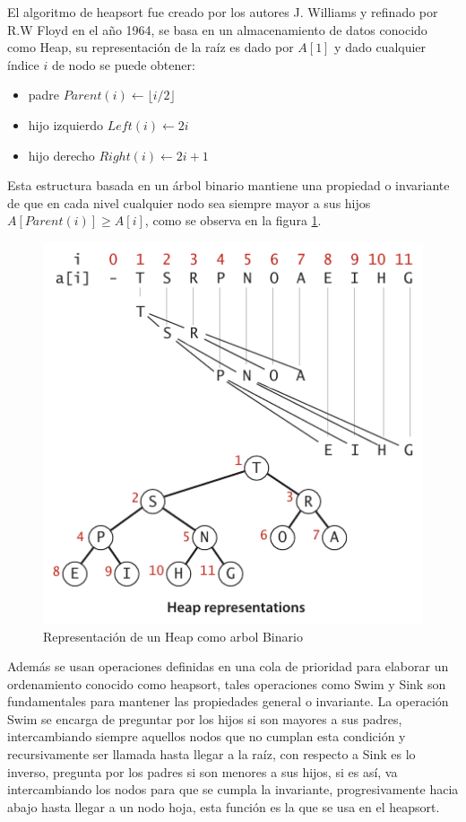 \documentclass{article}
\begin{document}
    		        El algoritmo de heapsort fue creado por los autores J. Williams y refinado por R.W Floyd en el año 1964, se basa en un almacenamiento de datos conocido como Heap, su representación de la ra\'{i}z es dado por $A[1]$ y dado cualquier \'{i}ndice $i$ de nodo se puede obtener:
    		        \begin{itemize}
    		            \item padre $Parent(i) \leftarrow \lfloor i/2 \rfloor$
    		            \item hijo izquierdo $Left(i) \leftarrow 2i$
    		            \item hijo derecho $Right(i) \leftarrow 2i + 1$
    		        \end{itemize}
    		        
    		        Esta estructura basada en un \'{a}rbol binario mantiene una propiedad o invariante de que en cada nivel cualquier nodo sea siempre mayor a sus hijos $A[Parent(i)] \geq A[i]$, como se observa en la figura \ref{fig:heap_repr}.
    		         
    		        \begin{figure}[H]
    		            \centering	 \includegraphics[scale=0.40]{img/heap_repre.png}
                        \caption{Representaci\'{o}n de un Heap como arbol Binario \cite{Algorithms}}
                        \label{fig:heap_repr}
                    \end{figure}
                    			
                    Adem\'{a}s  se usan operaciones definidas en una cola de prioridad para elaborar un ordenamiento conocido como heapsort, tales operaciones como Swim y Sink son fundamentales para mantener las propiedades general o invariante. La operaci\'{o}n Swim se encarga de preguntar por los hijos si son mayores a sus padres, intercambiando siempre aquellos nodos que no cumplan esta condici\'{o}n y recursivamente ser llamada hasta llegar a la ra\'{i}z, con respecto a Sink es lo inverso, pregunta por los padres si son menores a sus hijos, si es as\'{i}, va intercambiando los nodos para que se cumpla la invariante, progresivamente hacia abajo hasta llegar a un nodo hoja, esta funci\'{o}n es la que se usa en el heapsort.
    		            
\end{document}
